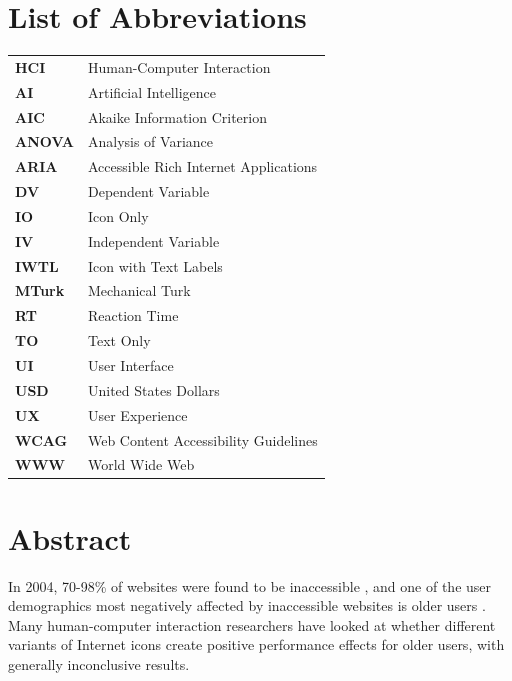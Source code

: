 \documentclass[12pt,twoside]{reedthesis}
\begin{document}
    \chapter*{List of Abbreviations}
	\begin{table}[H]
	\centering %
	\begin{tabular}{ll}
		\textbf{HCI}  	&  Human-Computer Interaction \\
		\textbf{AI} 	&  Artificial Intelligence\\
        \textbf{AIC}    &  Akaike Information Criterion\\
        \textbf{ANOVA}  &  Analysis of Variance\\
        \textbf{ARIA}   &  Accessible Rich Internet Applications \\
        \textbf{DV}     & Dependent Variable\\
        \textbf{IO}     & Icon Only\\
        \textbf{IV}     & Independent Variable\\
        \textbf{IWTL}   & Icon with Text Labels\\
		\textbf{MTurk} 	&  Mechanical Turk\\
        \textbf{RT}     &  Reaction Time \\
        \textbf{TO}     & Text Only\\
        \textbf{UI}  	&  User Interface \\
        \textbf{USD} 	&  United States Dollars\\
        \textbf{UX}  	&  User Experience \\
		\textbf{WCAG}  	&  Web Content Accessibility Guidelines\\
		\textbf{WWW} 	&  World Wide Web\\
	\end{tabular}
	\end{table}
	

    \tableofcontents
    \listoffigures
    \listoftables

\chapter*{Abstract}
    In 2004, 70-98\% of websites were found to be inaccessible \cite{lazar_improving_2004}, and one of the user demographics most negatively affected by inaccessible websites is older users \cite{stephanidis_seven_2019}. Many human-computer interaction researchers have looked at whether different variants of Internet icons create positive performance effects for older users, with generally inconclusive results. 
    
\end{document}
